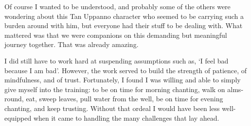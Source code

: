 Of course I wanted to be understood, and probably some of the
others were wondering about this Tan Uppanno \mbox{character} who seemed to be
carrying such a burden around with him, but everyone had their stuff to
be dealing with. What mattered was that we were companions on this
demanding but meaningful journey together. That was already amazing.

I did still have to work hard at suspending assumptions such as, `I feel
bad because I am bad'. However, the work served to build the strength of
patience, of mindfulness, and of trust. Fortunately, I found I was
willing and able to simply give myself into the training: to be on time
for morning chanting, walk on alms-round, eat, sweep leaves, pull water
from the well, be on time for evening chanting, and keep trusting.
Without that ordeal I would have been less well-equipped when it came to
handling the many challenges that lay ahead.
